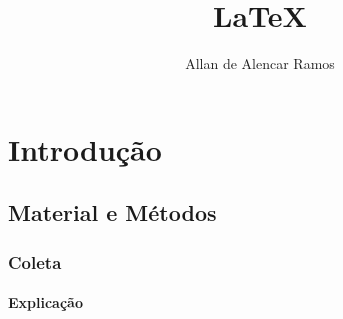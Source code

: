 \documentclass[12pt, a4paper, oneside]{book}
\begin{document}
\title{LaTeX}
\author{Allan de Alencar Ramos} 
\maketitle

\chapter*{Introdução}


\section*{Material e Métodos}

\subsection*{Coleta}

\subsubsection{Explicação}
\end{document}
